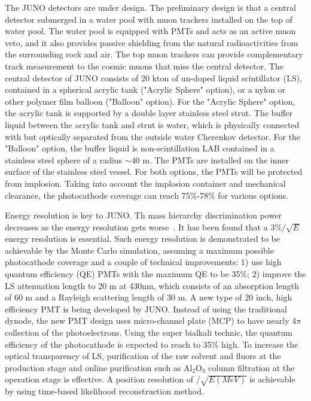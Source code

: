 The JUNO detectors are under design. The preliminary design is that a central detector submerged in a water pool with muon trackers installed on the top of water pool. The water pool is equipped with PMTs and acts as an active muon veto, and it also provides passive shielding from the natural radioactivities from the surrounding rock and air. The top muon trackers can provide complementary track measurement to the cosmic muons that miss the central detector. The central detector of JUNO consists of 20 kton of un-doped liquid scintillator (LS), contained in a spherical acrylic tank ("Acrylic Sphere" option), or a nylon or other polymer film balloon ("Balloon" option). For the "Acrylic Sphere" option, the acrylic tank is supported by a double layer stainless steel strut. The buffer liquid between the acrylic tank and strut is water, which is physically connected with but optically separated from the outside water Cherenkov detector. For the "Balloon" option, the buffer liquid is non-scintillation LAB contained in a stainless steel sphere of a radius $\sim $40 m. The PMTs are installed on the inner surface of the stainless steel vessel. For both options, the PMTs will be protected from implosion. Taking into account the implosion container and mechanical clearance, the photocathode coverage can reach 75\%-78\% for various options.

Energy resolution is key to JUNO. Th mass hierarchy discrimination power decreases as the energy resolution gets worse~\cite{Li-PRD13}.
It has been found that a $3\%/\sqrt{E}$ energy resolution is essential. Such energy resolution is demonstrated to be achievable by the Monte Carlo simulation, assuming a maximum possible photocathode coverage and a couple of technical improvements: 1) use high quantum efficiency (QE) PMTs with the maximum QE to be 35\%; 2) improve the LS attenuation length to 20 m at 430nm, which consists of an absorption length of 60 m and a Rayleigh scattering length of 30 m. A new type of 20 inch, high efficiency PMT is being developed by JUNO. Instead of using the traditional dynode, the new PMT design uses micro-channel plate (MCP) to have nearly 4$\pi$ collection of the photoelectrons. Using the super bialkali technic, the quantum efficiency of the photocathode is expected to reach to 35\% high. To increase the optical transparency of LS, purification of the raw solvent and fluors at the production stage and online purification such as Al$_2$O$_3$ column filtration at the operation stage is effective. A position resolution of /$\sqrt{E (MeV)}$ is achievable by using time-based likelihood reconstruction method.

